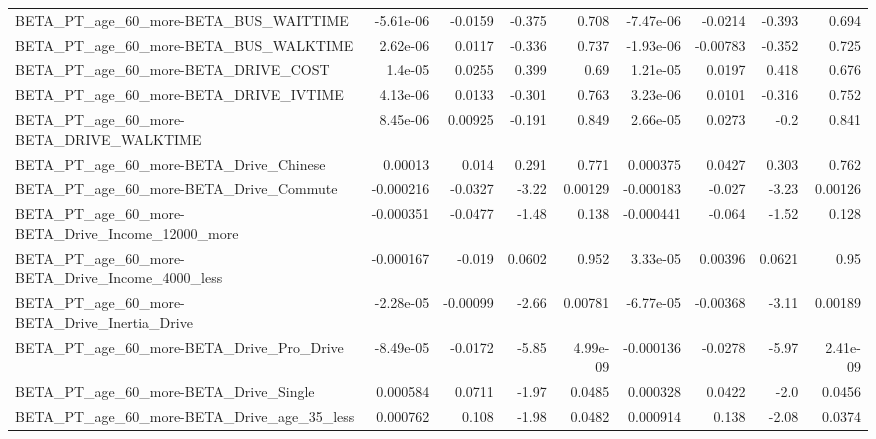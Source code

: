 \begin{tabular}{lrrrrrrrr}
BETA\_PT\_age\_60\_more-BETA\_BUS\_WAITTIME              &   -5.61e-06 &      -0.0159 &   -0.375 &    0.708 &  -7.47e-06 &     -0.0214 &       -0.393 &         0.694 \\
BETA\_PT\_age\_60\_more-BETA\_BUS\_WALKTIME              &    2.62e-06 &       0.0117 &   -0.336 &    0.737 &  -1.93e-06 &    -0.00783 &       -0.352 &         0.725 \\
BETA\_PT\_age\_60\_more-BETA\_DRIVE\_COST                &     1.4e-05 &       0.0255 &    0.399 &     0.69 &   1.21e-05 &      0.0197 &        0.418 &         0.676 \\
BETA\_PT\_age\_60\_more-BETA\_DRIVE\_IVTIME              &    4.13e-06 &       0.0133 &   -0.301 &    0.763 &   3.23e-06 &      0.0101 &       -0.316 &         0.752 \\
BETA\_PT\_age\_60\_more-BETA\_DRIVE\_WALKTIME            &    8.45e-06 &      0.00925 &   -0.191 &    0.849 &   2.66e-05 &      0.0273 &         -0.2 &         0.841 \\
BETA\_PT\_age\_60\_more-BETA\_Drive\_Chinese             &     0.00013 &        0.014 &    0.291 &    0.771 &   0.000375 &      0.0427 &        0.303 &         0.762 \\
BETA\_PT\_age\_60\_more-BETA\_Drive\_Commute             &   -0.000216 &      -0.0327 &    -3.22 &  0.00129 &  -0.000183 &      -0.027 &        -3.23 &       0.00126 \\
BETA\_PT\_age\_60\_more-BETA\_Drive\_Income\_12000\_more   &   -0.000351 &      -0.0477 &    -1.48 &    0.138 &  -0.000441 &      -0.064 &        -1.52 &         0.128 \\
BETA\_PT\_age\_60\_more-BETA\_Drive\_Income\_4000\_less    &   -0.000167 &       -0.019 &   0.0602 &    0.952 &   3.33e-05 &     0.00396 &       0.0621 &          0.95 \\
BETA\_PT\_age\_60\_more-BETA\_Drive\_Inertia\_Drive       &   -2.28e-05 &     -0.00099 &    -2.66 &  0.00781 &  -6.77e-05 &    -0.00368 &        -3.11 &       0.00189 \\
BETA\_PT\_age\_60\_more-BETA\_Drive\_Pro\_Drive           &   -8.49e-05 &      -0.0172 &    -5.85 & 4.99e-09 &  -0.000136 &     -0.0278 &        -5.97 &      2.41e-09 \\
BETA\_PT\_age\_60\_more-BETA\_Drive\_Single              &    0.000584 &       0.0711 &    -1.97 &   0.0485 &   0.000328 &      0.0422 &         -2.0 &        0.0456 \\
BETA\_PT\_age\_60\_more-BETA\_Drive\_age\_35\_less         &    0.000762 &        0.108 &    -1.98 &   0.0482 &   0.000914 &       0.138 &        -2.08 &        0.0374 \\

\end{tabular}
